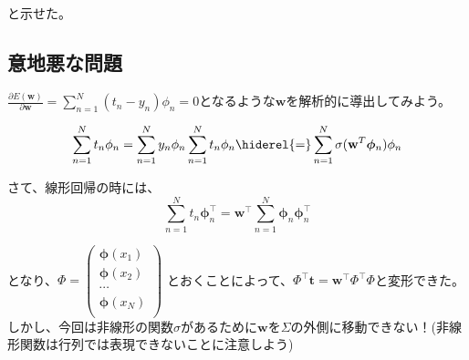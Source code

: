 と示せた。

\subsection*{意地悪な問題}
$\frac{\partial E(\mathbf{w})}{\partial \mathbf{w}} =  \sum_{n=1}^N (t_n - y_n) \phi_n = 0$となるような$\mathbf{w}$を解析的に導出してみよう。

\begin{dmath*}
\sum_{n=1}^N t_n \phi_n = \sum_{n=1}^N y_n \phi_n \\
\sum_{n=1}^N t_n \phi_n \hiderel{=} \sum_{n=1}^N  \sigma(\mathbf{w}^T \bm{\phi}_n) \phi_n
\end{dmath*}

さて、線形回帰の時には、
\begin{equation}
	\sum_{n=1}^N t_n \bm{\phi}_n^{\top} =  \mathbf{w}^{\top} \sum_{n=1}^N \bm{\phi}_n \bm{\phi}_n^{\top}
\end{equation}

となり、$\Phi = \begin{pmatrix} 
\bm{\phi}(x_1) \\
\bm{\phi}(x_2) \\
\cdots \\
\bm{\phi}(x_N) \\
\end{pmatrix}$ とおくことによって、$\Phi^{\top} \mathbf{t} = \mathbf{w}^{\top} \Phi^{\top} \Phi$と変形できた。しかし、今回は非線形の関数$\sigma$があるために$\mathbf{w}$を$\Sigma$の外側に移動できない！(非線形関数は行列では表現できないことに注意しよう)






